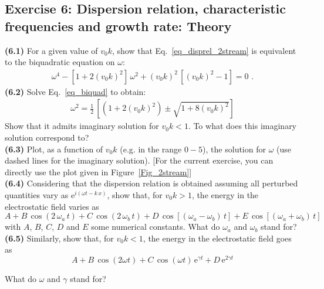 \documentclass[11pt,a4paper]{article}
\begin{document}
\subsection*{Exercise 6: Dispersion relation, characteristic frequencies and growth rate: Theory}

{\bf (6.1)} For a given value of $v_0 k$, show that Eq.~\eqref{eq_disprel_2stream} is equivalent to the biquadratic equation on $\omega$:
\begin{eqnarray}\label{eq_biquad}
\omega^4 - \left[1+2 (v_0 k)^2\right]\,\omega^2 + (v_0 k)^2\,\left[(v_0 k)^2-1\right] = 0\,\,.
\end{eqnarray}
{\bf (6.2)} Solve Eq.~\eqref{eq_biquad} to obtain:
\begin{eqnarray}
\omega^2 = \frac{1}{2}\,\left[ \left(1+2 (v_0 k)^2\right) \pm \sqrt{1+8 (v_0 k)^2} \right]
\end{eqnarray}
Show that it admits imaginary solution for $v_0 k<1$. To what does this imaginary solution correspond to?\\
{\bf (6.3)} Plot, as a function of $v_0 k$ (e.g. in the range $0 - 5$),  the solution for $\omega$ (use dashed lines for the imaginary solution). [For the current exercise, you can directly use the plot given in Figure~\ref{Fig_2stream}]\\
{\bf (6.4)} Considering that the dispersion relation is obtained assuming all perturbed quantities vary as $\mathrm{e}^{i(\omega t - k\,x)}$, show that, for $v_0 k>1$, the energy in the electrostatic field varies as 
\begin{equation*}
A + B\,\cos(2\,\omega_a\,t) + C\,\cos(2\,\omega_b\,t) + D\,\cos\left[(\omega_a-\omega_b)\,t\right] + E\,\cos\left[(\omega_a+\omega_b)\,t\right]
\end{equation*}
 with $A$, $B$, $C$, $D$ and $E$ some numerical constants. What do $\omega_a$ and $\omega_b$ stand for?\\
{\bf (6.5)} Similarly, show that, for $v_0 k<1$, the energy in the electrostatic field goes as  
\begin{equation*}
A + B\,\cos(2\omega t) + C\,\cos(\omega t)\,\mathrm{e}^{\gamma t}+D\,\mathrm{e}^{2\gamma t}
\end{equation*}

What do $\omega$ and $\gamma$ stand for? 

\end{document}
